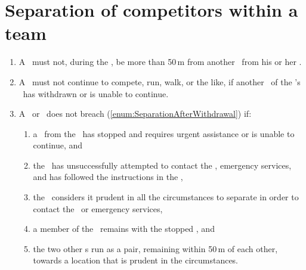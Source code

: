 \documentclass[12pt]{report}
\begin{document}
  \section{Separation of competitors within a team}\label{sec:Separation}
  \begin{enumerate}
    \item A \competitor\ must not, during the \race, be more than 50\,m from another \competitor\ from his or her \team.

    \item A \competitor\ must not continue to compete, run, walk, or the like, if another \competitor\ of the \competitor's \team\ has withdrawn or is unable to continue.\label{enum:SeparationAfterWithdrawal}

    \item A \competitor\ or \team\ does not breach \thesection(\ref{enum:SeparationAfterWithdrawal}) if:
    \begin{enumerate}
      \item a \competitor\ from the \team\ has stopped and requires urgent assistance or is unable to continue, and
      \item the \team\ has unsuccessfully attempted to contact the \RaceDirector, emergency services, and has followed the instructions in the \TeamEnvelope,
      \item the \team\ considers it prudent in all the circumstances to separate in order to contact the \RaceDirector\ or emergency services,
      \item a member of the \team\ remains with the stopped \competitor, and
      \item the two other \competitor s run as a pair, remaining within 50\,m of each other, towards a location that is prudent in the circumstances.
    \end{enumerate}
  \end{enumerate}
\end{document}
